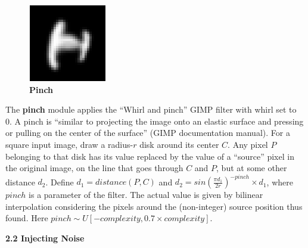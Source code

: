 \documentclass{article} %
\begin{document}
\begin{minipage}[h]{\linewidth}
\begin{figure}
\vspace*{-5mm}
\begin{center}
\includegraphics[scale=.4]{images/Pinch_only.png}\\
{\bf Pinch}
\end{center}
\end{figure}
The {\bf pinch} module applies the ``Whirl and pinch'' GIMP filter with whirl set to 0. 
A pinch is ``similar to projecting the image onto an elastic
surface and pressing or pulling on the center of the surface'' (GIMP documentation manual).
For a square input image, draw a radius-$r$ disk
around its center $C$. Any pixel $P$ belonging to
that disk has its value replaced by
the value of a ``source'' pixel in the original image,
on the line that goes through $C$ and $P$, but
at some other distance $d_2$. Define $d_1=distance(P,C)$
and $d_2 = sin(\frac{\pi{}d_1}{2r})^{-pinch} \times
d_1$, where $pinch$ is a parameter of the filter.
The actual value is given by bilinear interpolation considering the pixels
around the (non-integer) source position thus found.
Here $pinch \sim U[-complexity, 0.7 \times complexity]$.
\end{minipage}

\vspace{1mm}

{\large\bf 2.2 Injecting Noise}
\end{document}
